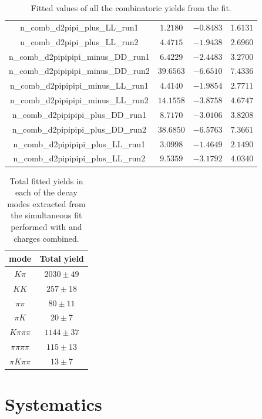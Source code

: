 \begin{table}[h]
{\begin{tabular}{cccc}
n\_comb\_d2pipi\_plus\_LL\_run1 & $1.2180$ & $-0.8483$ & $1.6131$ \\
n\_comb\_d2pipi\_plus\_LL\_run2 & $4.4715$ & $-1.9438$ & $2.6960$ \\
n\_comb\_d2pipipipi\_minus\_DD\_run1 & $6.4229$ & $-2.4483$ & $3.2700$ \\
n\_comb\_d2pipipipi\_minus\_DD\_run2 & $39.6563$ & $-6.6510$ & $7.4336$ \\
n\_comb\_d2pipipipi\_minus\_LL\_run1 & $4.4140$ & $-1.9854$ & $2.7711$ \\
n\_comb\_d2pipipipi\_minus\_LL\_run2 & $14.1558$ & $-3.8758$ & $4.6747$ \\
n\_comb\_d2pipipipi\_plus\_DD\_run1 & $8.7170$ & $-3.0106$ & $3.8208$ \\
n\_comb\_d2pipipipi\_plus\_DD\_run2 & $38.6850$ & $-6.5763$ & $7.3661$ \\
n\_comb\_d2pipipipi\_plus\_LL\_run1 & $3.0998$ & $-1.4649$ & $2.1490$ \\
n\_comb\_d2pipipipi\_plus\_LL\_run2 & $9.5359$ & $-3.1792$ & $4.0340$ \\
\end{tabular}}
\caption{Fitted values of all the combinatoric yields from the \CP fit.}
\label{cpfitresultscomb}
\end{table}

\begin{table}
\centering
\begin{tabular}{c|c}
\hline
\D mode & Total yield \\
\hline
$K\pi$ & $2030 \pm 49$ \\
$KK$ & $257 \pm 18$ \\
$\pi\pi$ & $80 \pm 11$ \\
$\pi K$ & $20 \pm 7$ \\
$K\pi\pi\pi$ & $1144 \pm 37$ \\
$\pi\pi\pi\pi$ & $115 \pm 13$ \\
$\pi K\pi\pi$ & $13 \pm 7$ \\
\hline
\end{tabular}
\caption{Total fitted yields in each of the \Dz decay modes extracted from the simultaneous fit performed with \Bm and \Bp charges combined.}
\label{fittedyields}
\end{table}



\clearpage

\section{Systematics}
\label{sec:systematics}

